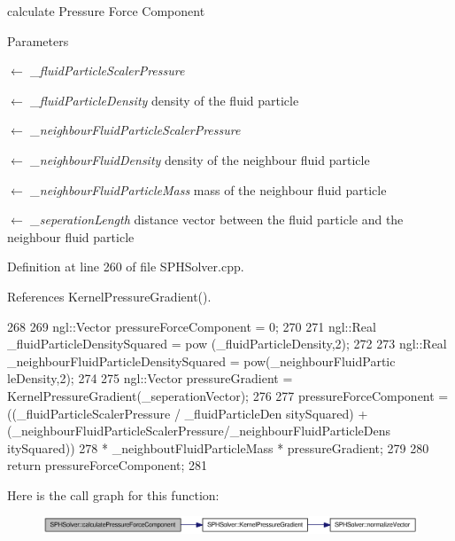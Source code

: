 calculate Pressure Force Component 


\begin{DoxyParams}{Parameters}
\item[\mbox{$\leftarrow$} {\em \_\-fluidParticleScalerPressure}]\item[\mbox{$\leftarrow$} {\em \_\-fluidParticleDensity}]density of the fluid particle \item[\mbox{$\leftarrow$} {\em \_\-neighbourFluidParticleScalerPressure}]\item[\mbox{$\leftarrow$} {\em \_\-neighbourFluidDensity}]density of the neighbour fluid particle \item[\mbox{$\leftarrow$} {\em \_\-neighbourFluidParticleMass}]mass of the neighbour fluid particle \item[\mbox{$\leftarrow$} {\em \_\-seperationLength}]distance vector between the fluid particle and the neighbour fluid particle \end{DoxyParams}


Definition at line 260 of file SPHSolver.cpp.



References KernelPressureGradient().




\begin{DoxyCode}
268 {
269       ngl::Vector pressureForceComponent = 0;
270 
271       ngl::Real _fluidParticleDensitySquared = pow (_fluidParticleDensity,2);
272 
273       ngl::Real _neighbourFluidParticleDensitySquared = pow(_neighbourFluidPartic
      leDensity,2);
274 
275       ngl::Vector pressureGradient = KernelPressureGradient(_seperationVector);
276 
277       pressureForceComponent = ((_fluidParticleScalerPressure / _fluidParticleDen
      sitySquared) + (_neighbourFluidParticleScalerPressure/_neighbourFluidParticleDens
      itySquared))
278                             * _neighboutFluidParticleMass * pressureGradient;
279 
280       return pressureForceComponent;
281 }
\end{DoxyCode}




Here is the call graph for this function:\nopagebreak
\begin{figure}[H]
\begin{center}
\leavevmode
\includegraphics[width=325pt]{class_s_p_h_solver_ad137f4330190d8627fdb93ba373bb406_cgraph}
\end{center}
\end{figure}


